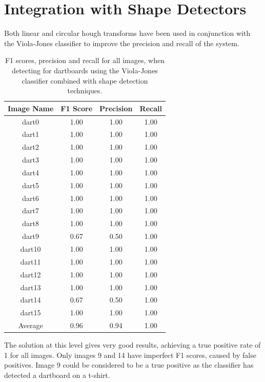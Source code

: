 \documentclass[conference]{IEEEtran}
\begin{document}
\clearpage
\section{Integration with Shape Detectors}
Both linear and circular hough transforms have been used in conjunction with the Viola-Jones classifier to improve the precision and recall of the system. 
\par

\begin{table}[htp]
\caption{F1 scores, precision and recall for all images, when detecting for dartboards using the Viola-Jones classifier combined with shape detection techniques. }
\begin{center}
\begin{tabular}{||c|c|c|c||}
\hline
Image Name		 	& F1 Score 	& Precision	& Recall            \\ \hline
dart0					& 1.00		&	1.00		& 1.00		\\
dart1					& 1.00		&	1.00		& 1.00		\\
dart2					& 1.00		&	1.00		& 1.00		\\
dart3					& 1.00		&	1.00		& 1.00		\\
dart4					& 1.00		&	1.00		& 1.00		\\
dart5					& 1.00		&	1.00		& 1.00		\\
dart6					& 1.00		&	1.00		& 1.00		\\
dart7					& 1.00		&	1.00		& 1.00		\\
dart8					& 1.00		&	1.00		& 1.00		\\
dart9					& 0.67		&	0.50		& 1.00		\\
dart10				& 1.00		&	1.00		& 1.00		\\
dart11				& 1.00		&	1.00		& 1.00		\\
dart12				& 1.00		&	1.00		& 1.00		\\
dart13				& 1.00		&	1.00		& 1.00		\\
dart14				& 0.67		&	0.50		& 1.00		\\
dart15				& 1.00		&	1.00		& 1.00		\\ \hline
Average 		 		& 0.96		&	0.94		& 1.00 		\\ \hline
\end{tabular}
\end{center}
\label{default}
\end{table}
\par
The solution at this level gives very good results, achieving a true positive rate of 1 for all images. Only images 9 and 14 have imperfect F1 scores, caused by false positives. Image 9 could be considered to be a true positive as the classifier has detected a dartboard on a t-shirt. 
\par
\end{document}
